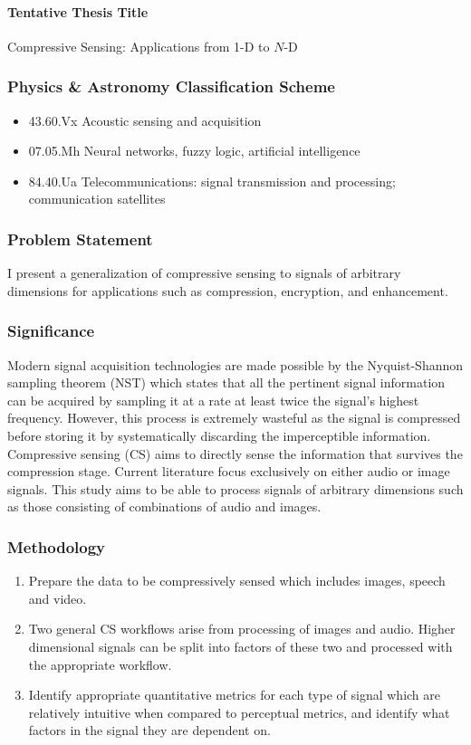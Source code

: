 \documentclass[10pt,oneside]{article}
\begin{document}
\paragraph{Tentative Thesis Title} Compressive Sensing: Applications from 1-D to $N$-D

\subsubsection*{Physics & Astronomy Classification Scheme}
\begin{itemize}
	\item 43.60.Vx \quad Acoustic sensing and acquisition
	\item 07.05.Mh \quad Neural networks, fuzzy logic, artificial intelligence
	\item 84.40.Ua \quad Telecommunications: signal transmission and processing; communication satellites
\end{itemize}

\subsubsection*{Problem Statement}
I present a generalization of compressive sensing to signals of arbitrary dimensions for applications such as compression, encryption, and enhancement.

\subsubsection*{Significance}
Modern signal acquisition technologies are made possible by the Nyquist-Shannon sampling theorem (NST) which states that all the pertinent signal information can be acquired by sampling it at a rate at least twice the signal's highest frequency. However, this process is extremely wasteful as the signal is compressed before storing it by systematically discarding the imperceptible information. Compressive sensing (CS) aims to directly sense the information that survives the compression stage. Current literature focus exclusively on either audio or image signals. This study aims to be able to process signals of arbitrary dimensions such as those consisting of combinations of audio and images.

\subsubsection*{Methodology}
\begin{enumerate}
	\item Prepare the data to be compressively sensed which includes images, speech and video.
	\item Two general CS workflows arise from processing of images and audio. Higher dimensional signals can be split into factors of these two and processed with the appropriate workflow.
	\item Identify appropriate quantitative metrics for each type of signal which are relatively intuitive when compared to perceptual metrics, and identify what factors in the signal they are dependent on.
\end{enumerate}
\end{document}
